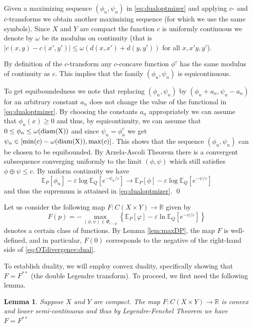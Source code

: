\documentclass{amsart}
\newtheorem{lemma}[theorem]{Lemma}
\theoremstyle{definition}
\theoremstyle{remark}
\numberwithin{equation}{section}
\begin{document}
Given a maximizing sequence $(\phi_n, \psi_n)$ in \eqref{eq:dualoptmizer} and applying $c$- and $\overline{c}$-transforms we obtain another maximizing sequence (for which we use the same symbols). Since $X$ and $Y$ are compact the function $c$ is uniformly continuous we denote by $\omega$ be its modulus on continuity (that is  $|c(x,y)-c(x',y')|\le \omega(d(x,x')+d(y,y'))$ for all $x,x'y,y'$). 


By definition of the $c$-transform any $c$-concave function $\phi^c$ has
the same modulus of continuity as $c$. This implies that the family $(\phi_n, \psi_n)$ is equicontinuous. 

To get equiboundedness we note that replacing $(\phi_n,\psi_n)$
by $(\phi_n+a_n, \psi_n-a_n)$ for an arbitrary constant $a_n$ does not change the value of the functional in \eqref{eq:dualoptmizer}. By choosing the constants $a_n$ appropriately we can assume that $\phi_n(x)\ge 0$ and thus, by equicontinuity,  we can assume that $0 \le \phi_n \le \omega({\rm diam(X)})$ and since $\psi_n=\phi_n^c$ we get $\psi_n \in [\min(c)- \omega({\rm diam(X)}), \max(c)]$.
This shows that the sequence $(\phi_n,\psi_n)$ can be chosen to be equibounded. By Arzela-Ascoli Theorem there is a convergent subsequence converging uniformly to the  limit $(\phi,\psi)$ which  still satisfies $\phi \oplus \psi\le c$.  By uniform continuity we have 
\begin{equation}
\mathbb{E}_P[\phi_n] -\varepsilon \log \mathbb{E}_Q[e^{-\psi_n/\varepsilon}] 
\rightarrow \mathbb{E}_P[\phi] -\varepsilon \log \mathbb{E}_Q[e^{-\psi/\varepsilon}]
\end{equation}
and thus the supremum is attained in \eqref{eq:dualoptmizer}.
\qed

Let us consider the following map $F: C(X \times Y) \to \mathbb{R}$ given by 
\begin{equation}\label{eq:Fmap.definition}
F(p) = - \max_{(\phi, \psi)\in \Phi_{c-p}} \left\{ \mathbb{E}_P[\varphi] - \varepsilon \ln \mathbb{E}_Q[e^{-\psi/\varepsilon}]\right\}
\end{equation}
denotes a certain class of functions. By Lemma \ref{lem:maxDP}, the map $F$ is well-defined, and in particular, $F(0)$ corresponds to the negative of the right-hand side of \eqref{eq:OTdivergence:dual}.

To establish duality, we will employ convex duality, specifically showing that $F=F^{**}$ (the double Legendre transform). To proceed, we first need the following lemma.


\begin{lemma}\label{lem:Fmap.lsc.convex}
Suppose $X$ and $Y$ are compact. The map $F: C(X \times Y)\to \mathbb{R}$ is convex and lower semi-continuous
and thus by Legendre-Fenchel Theorem we have $F=F^{**}$ 
\end{lemma}
\end{document}
